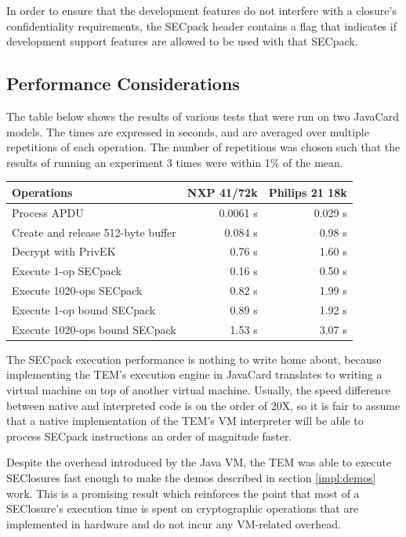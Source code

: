 In order to ensure that the development features do not interfere with a
closure's confidentiality requirements, the SECpack header contains a flag that
indicates if development support features are allowed to be used with that
SECpack.

\subsection{Performance Considerations}
The table below shows the results of various tests that were run on two
JavaCard models. The times are expressed in seconds, and are averaged over
multiple repetitions of each operation. The number of repetitions was chosen
such that the results of running an experiment 3 times were within 1\% of the
mean.

\begin{center}
\begin{tabular}{|l|r|r|}
\hline
\textbf{Operations} & \textbf{NXP 41/72k} & \textbf{Philips 21 18k} \\
\hline
Process APDU & 0.0061 s & 0.029 s \\
\hline
Create and release 512-byte buffer & 0.084 s & 0.98 s \\
\hline
Decrypt with PrivEK & 0.76 s & 1.60 s \\
\hline
Execute 1-op SECpack & 0.16 s & 0.50 s \\
\hline
Execute 1020-ops SECpack & 0.82 s & 1.99 s \\
\hline
Execute 1-op bound SECpack & 0.89 s & 1.92 s \\
\hline
Execute 1020-ops bound SECpack & 1.53 s & 3.07 s \\
\hline
\end{tabular}
\end{center}

The SECpack execution performance is nothing to write home about, because
implementing the TEM's execution engine in JavaCard translates to writing a
virtual machine on top of another virtual machine. Usually, the speed difference
between native and interpreted code is on the order of 20X, so it is fair to
assume that a native implementation of the TEM's VM interpreter will be able
to process SECpack instructions an order of magnitude faster.

Despite the overhead introduced by the Java VM, the TEM was able to execute
SEClosures fast enough to make the demos described in section \ref{impl:demos}
work. This is a promising result which reinforces the point that most of a
SEClosure's execution time is spent on cryptographic operations that are
implemented in hardware and do not incur any VM-related overhead.
